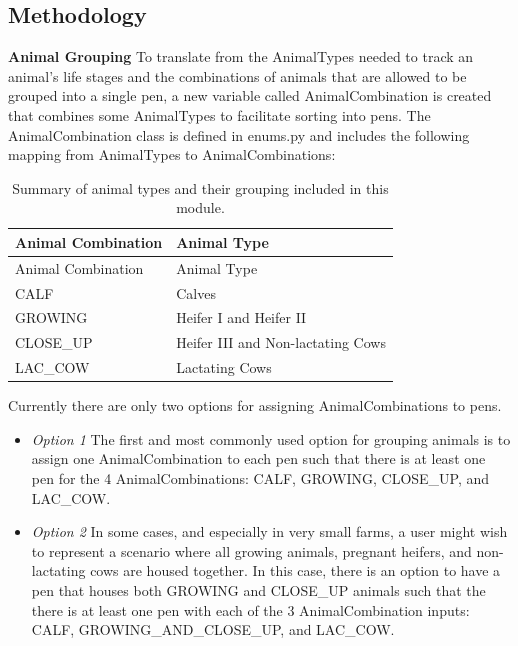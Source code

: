\documentclass[
  letterpaper,
  oneside,
  openany]{scrbook}
\begin{document}
\subsection{Methodology}\label{methodology-1}

\textbf{Animal Grouping} To translate from the AnimalTypes needed to
track an animal's life stages and the combinations of animals that are
allowed to be grouped into a single pen, a new variable called
AnimalCombination is created that combines some AnimalTypes to
facilitate sorting into pens. The AnimalCombination class is defined in
enums.py and includes the following mapping from AnimalTypes to
AnimalCombinations:

\begin{longtable}[]{@{}ll@{}}
\caption{Summary of animal types and their grouping included in this
module.}\label{tbl-animal-grp-inputs}\tabularnewline
\toprule\noalign{}
Animal Combination & Animal Type \\
\midrule\noalign{}
\endfirsthead
\toprule\noalign{}
Animal Combination & Animal Type \\
\midrule\noalign{}
\endhead
\bottomrule\noalign{}
\endlastfoot
CALF & Calves \\
GROWING & Heifer I and Heifer II \\
CLOSE\_UP & Heifer III and Non-lactating Cows \\
LAC\_COW & Lactating Cows \\
\end{longtable}

Currently there are only two options for assigning AnimalCombinations to
pens.

\begin{itemize}
\item
  \emph{Option 1} The first and most commonly used option for grouping
  animals is to assign one AnimalCombination to each pen such that there
  is at least one pen for the 4 AnimalCombinations: CALF, GROWING,
  CLOSE\_UP, and LAC\_COW.
\item
  \emph{Option 2} In some cases, and especially in very small farms, a
  user might wish to represent a scenario where all growing animals,
  pregnant heifers, and non-lactating cows are housed together. In this
  case, there is an option to have a pen that houses both GROWING and
  CLOSE\_UP animals such that the there is at least one pen with each of
  the 3 AnimalCombination inputs: CALF, GROWING\_AND\_CLOSE\_UP, and
  LAC\_COW.
\end{itemize}
\end{document}
